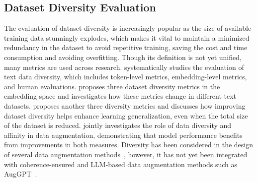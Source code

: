 \subsection{Dataset Diversity Evaluation}
\vspace{-0.1cm}
The evaluation of dataset diversity is increasingly popular as the size of available training data stunningly explodes, which makes it vital to maintain a minimized redundancy in the dataset to avoid repetitive training, saving the cost and time consumption and avoiding overfitting. 
Though its definition is not yet unified, many metrics are used across research. %
\cite{tevet2021evaluating} systematically studies the evaluation of text data diversity, which includes token-level metrics, embedding-level metrics, and human evaluations. 
\cite{lai2020diversity} proposes three dataset diversity metrics in the embedding space and investigates how these metrics change in different text datasets. 
\cite{yu2022can} proposes another three diversity metrics and discusses how improving dataset diversity helps enhance learning generalization, even when the total size of the dataset is reduced.
\cite{gontijo2020affinity} jointly investigates the role of data diversity and affinity in data augmentation, demonstrating that model performance benefits from improvements in both measures. 
Diversity has been considered in the design of several data augmentation methods~\cite{malandrakis2019controlled,liu2021divaug}, however, it has not yet been integrated with coherence-ensured and LLM-based data augmentation methods such as AugGPT~\cite{dai2025auggpt}. 
